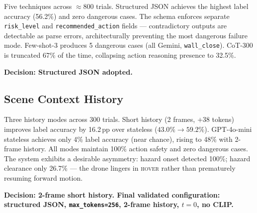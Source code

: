 \documentclass[journal]{IEEEtran}
\begin{document}
Five techniques across $\approx$800 trials.
Structured JSON achieves the highest label accuracy (56.2\%) and
zero dangerous cases.
The schema enforces separate \texttt{risk\_level} and
\texttt{recommended\_action} fields --- contradictory outputs are
detectable as parse errors, architecturally preventing the most
dangerous failure mode.
Few-shot-3 produces 5 dangerous cases (all Gemini,
\texttt{wall\_close}).
CoT-300 is truncated 67\% of the time, collapsing action reasoning
presence to 32.5\%.

\textbf{Decision: Structured JSON adopted.}

\subsection{Scene Context History}

Three history modes across 300 trials.
Short history (2 frames, $+$38 tokens) improves label accuracy by
16.2\,pp over stateless ($43.0\%\!\to\!59.2\%$).
GPT-4o-mini stateless achieves only 4\% label accuracy (near
chance), rising to 48\% with 2-frame history.
All modes maintain 100\% action safety and zero dangerous cases.
The system exhibits a desirable asymmetry: hazard onset detected
100\%; hazard clearance only 26.7\% --- the drone lingers in
\textsc{hover} rather than prematurely resuming forward motion.

\textbf{Decision: 2-frame short history.
Final validated configuration: structured JSON,
\texttt{max\_tokens=256}, 2-frame history, $t=0$, no CLIP.}
\end{document}
